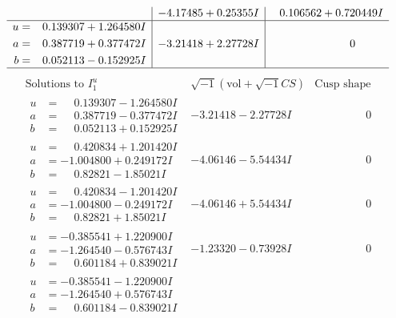 \documentclass[1p]{elsarticle_modified}
\theoremstyle{definition}
\newcommand{\I}{\sqrt{-1}}
\begin{document}
$$\begin{array}{c|c|c}
 & -4.17485 + 0.25355 I & \phantom{-}0.106562 + 0.720449 I \\ \hline\begin{aligned}
u &= \phantom{-}0.139307 + 1.264580 I \\
a &= \phantom{-}0.387719 + 0.377472 I \\
b &= \phantom{-}0.052113 - 0.152925 I\end{aligned}
 & -3.21418 + 2.27728 I & \phantom{-0.000000 } 0\\
 \hline 
 \end{array}$$\newpage$$\begin{array}{c|c|c}  
\text{Solutions to }I^u_{1}& \I (\text{vol} + \sqrt{-1}CS) & \text{Cusp shape}\\
 \hline 
\begin{aligned}
u &= \phantom{-}0.139307 - 1.264580 I \\
a &= \phantom{-}0.387719 - 0.377472 I \\
b &= \phantom{-}0.052113 + 0.152925 I\end{aligned}
 & -3.21418 - 2.27728 I & \phantom{-0.000000 } 0 \\ \hline\begin{aligned}
u &= \phantom{-}0.420834 + 1.201420 I \\
a &= -1.004800 + 0.249172 I \\
b &= \phantom{-}0.82821 - 1.85021 I\end{aligned}
 & -4.06146 - 5.54434 I & \phantom{-0.000000 } 0 \\ \hline\begin{aligned}
u &= \phantom{-}0.420834 - 1.201420 I \\
a &= -1.004800 - 0.249172 I \\
b &= \phantom{-}0.82821 + 1.85021 I\end{aligned}
 & -4.06146 + 5.54434 I & \phantom{-0.000000 } 0 \\ \hline\begin{aligned}
u &= -0.385541 + 1.220900 I \\
a &= -1.264540 - 0.576743 I \\
b &= \phantom{-}0.601184 + 0.839021 I\end{aligned}
 & -1.23320 - 0.73928 I & \phantom{-0.000000 } 0 \\ \hline\begin{aligned}
u &= -0.385541 - 1.220900 I \\
a &= -1.264540 + 0.576743 I \\
b &= \phantom{-}0.601184 - 0.839021 I\end{aligned}

\end{array}$$
\end{document}
